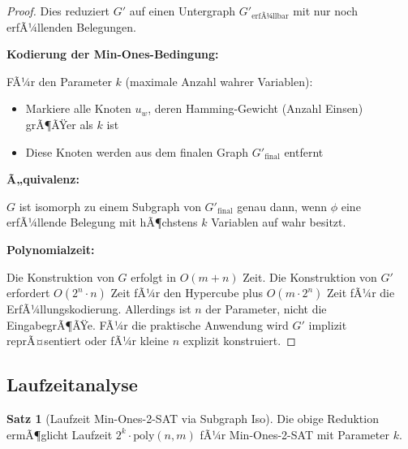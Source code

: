 ﻿\documentclass[a4paper,12pt]{article}
\theoremstyle{definition}
\newtheorem{satz}{Satz}[section]
\begin{document}
\begin{proof}
	Dies reduziert $G'$ auf einen Untergraph $G'_{\text{erfÃ¼llbar}}$ mit nur noch erfÃ¼llenden Belegungen.
	
	\textbf{Kodierung der Min-Ones-Bedingung:}
	
	FÃ¼r den Parameter $k$ (maximale Anzahl wahrer Variablen):
	\begin{itemize}
		\item Markiere alle Knoten $u_w$, deren Hamming-Gewicht (Anzahl Einsen) grÃ¶ÃŸer als $k$ ist
		\item Diese Knoten werden aus dem finalen Graph $G'_{\text{final}}$ entfernt
	\end{itemize}
	
	\textbf{Ã„quivalenz:}
	
	$G$ ist isomorph zu einem Subgraph von $G'_{\text{final}}$ genau dann, wenn $\phi$ eine erfÃ¼llende Belegung mit hÃ¶chstens $k$ Variablen auf wahr besitzt.
	
	\textbf{Polynomialzeit:}
	
	Die Konstruktion von $G$ erfolgt in $O(m + n)$ Zeit. Die Konstruktion von $G'$ erfordert $O(2^n \cdot n)$ Zeit fÃ¼r den Hypercube plus $O(m \cdot 2^n)$ Zeit fÃ¼r die ErfÃ¼llungskodierung. Allerdings ist $n$ der Parameter, nicht die EingabegrÃ¶ÃŸe. FÃ¼r die praktische Anwendung wird $G'$ implizit reprÃ¤sentiert oder fÃ¼r kleine $n$ explizit konstruiert.
\end{proof}

\subsection{Laufzeitanalyse}

\begin{satz}[Laufzeit Min-Ones-2-SAT via Subgraph Iso]
	Die obige Reduktion ermÃ¶glicht Laufzeit $2^k \cdot \text{poly}(n, m)$ fÃ¼r Min-Ones-2-SAT mit Parameter $k$.
\end{satz}
\end{document}
